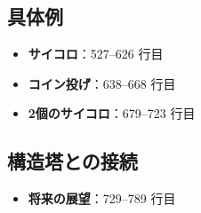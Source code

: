 \documentclass[12pt,a4paper,ja=standard]{bxjsarticle}
\theoremstyle{definition}
\begin{document}
\subsection*{具体例}

\begin{itemize}
    \item \textbf{サイコロ}：527--626 行目
    \item \textbf{コイン投げ}：638--668 行目
    \item \textbf{2個のサイコロ}：679--723 行目
\end{itemize}

\subsection*{構造塔との接続}

\begin{itemize}
    \item \textbf{将来の展望}：729--789 行目
\end{itemize}
\end{document}
